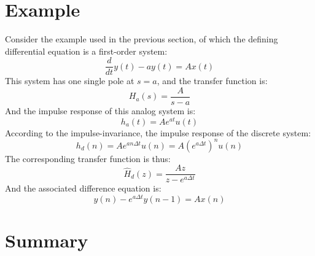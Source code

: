 \documentclass{article}
\begin{document}
\section{Example}
Consider the example used in the previous section, of which the defining differential equation is a first-order system:
\[
\frac{d}{dt}y(t)-ay(t)=Ax(t)
\]
This system has one single pole at \(s=a\), and the transfer function is:
\[
H_a(s)=\frac{A}{s-a}
\]
And the impulse response of this analog system is:
\[
h_a(t)=Ae^{at}u(t)
\]
According to the impulse-invariance, the impulse response of the discrete system:
\[
h_d(n)=Ae^{an\Delta t}u(n)=A(e^{a\Delta t})^nu(n)
\]
The corresponding transfer function is thus:
\[
\hat{H}_d(z)=\frac{Az}{z-e^{a\Delta t}}
\]
And the associated difference equation is:
\[
y(n)-e^{a\Delta t}y(n-1)=Ax(n)
\]
\newpage
\section{Summary}
\end{document}
